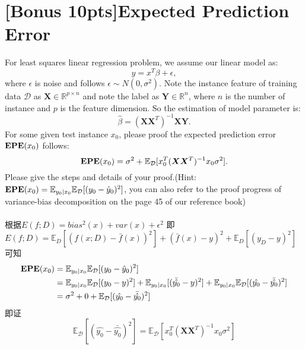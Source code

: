 \documentclass{article}
\begin{document}
	\section{[Bonus 10pts]Expected Prediction Error}
	For least squares linear regression problem, we assume our linear model as:\\
	\begin{equation}
	y=x^T \beta+\epsilon,
	\end{equation}
	where $\epsilon$ is noise and follows $\epsilon\sim N(0,\sigma^2)$. Note the instance feature of training data $\mathcal{D}$ as $\bm{X}\in\mathbb{R}^{p\times n}$ and note the label as $\bm{Y}\in\mathbb{R}^n$, where $n$ is the number of instance and $p$ is the feature dimension. So the estimation of model parameter is:\\
	\begin{equation}
	\hat{\beta}=(\bm{XX}^T)^{-1}\bm{XY}.
	\end{equation}
	For some given test instance $x_0$, please proof the expected prediction error $\text{\bf{EPE}}(x_0)$ follows:\\
	\begin{equation}
	\text{\bf{EPE}}(x_0)=\sigma^2+\mathbb{E}_{\mathcal{D}}[x^T_0(\bm{XX}^T)^{-1} x_0\sigma^2].
	\end{equation}
	Please give the steps and details of your proof.(Hint: $\text{\bf{EPE}}(x_0)=\mathbb{E}_{y_0|x_0}\mathbb{E}_{\mathcal{D}}[(y_0-\hat{y}_0)^2]$, you can also refer to the proof progress of variance-bias decomposition on the page 45 of our reference book) \\ \\
	根据$E(f;D) = bias^2(x) + var(x) + \epsilon ^2$ 即 \\
	$E(f;D) = \mathbb{E}_D[(f(x;D) - \bar{f}(x))^2] + (\bar{f}(x) - y)^2 + \mathbb{E}_D[(y_D - y)^2]$ \\
	可知
	\begin{equation}
	\begin{aligned}
	\text{\bf{EPE}}(x_0) 
	&= \mathbb{E}_{y_0|x_0}\mathbb{E}_{\mathcal{D}}[(y_0-\hat{y}_0)^2] \\
	&= \mathbb{E}_{y_0|x_0}\mathbb{E}_{\mathcal{D}}[(y_0-y)^2] + \mathbb{E}_{y_0|x_0}[(\bar{\hat{y_0}}-y)^2] + \mathbb{E}_{y_0|x_0}\mathbb{E}_{\mathcal{D}}[(\hat{y_0}-\bar{\hat{y_0}})^2] \\
	&= \sigma^2 + 0 + \mathbb{E}_{\mathcal{D}}[(\hat{y_0}-\bar{\hat{y_0}})^2]
	\end{aligned}
	\end{equation}
	即证
	\begin{equation}
	\mathbb{E}_{\mathcal{D}}[(\hat{y_0}-\bar{\hat{y_0}})^2]= \mathbb{E}_{\mathcal{D}}[x^T_0(\bm{XX}^T)^{-1} x_0\sigma^2]
	\end{equation}
	
\end{document}
